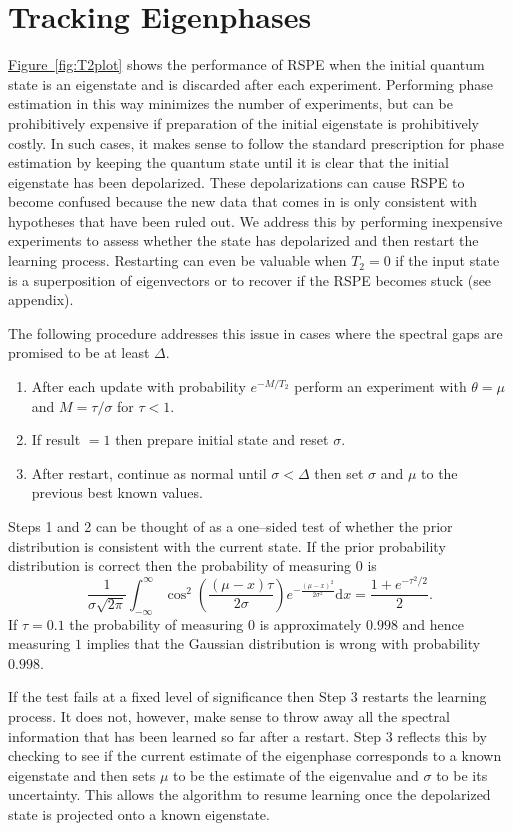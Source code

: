 \documentclass[aps,pra,amsmath,twocolumn,amssymb,superscriptaddress]{revtex4-1}
\newcommand{\fig}[1]{\hyperref[fig:#1]{Figure~\ref*{fig:#1}}}
\begin{document}
\section{Tracking Eigenphases}
\fig{T2plot} shows the performance of RSPE when the initial quantum state is an eigenstate and is discarded after each experiment.  Performing phase estimation in this way minimizes the number of experiments, but can be prohibitively expensive if preparation of the initial eigenstate is prohibitively costly.  In such cases, it makes sense to follow the standard prescription for phase estimation by keeping the quantum state until it is clear that the initial eigenstate has been depolarized.  These depolarizations can cause RSPE to become confused because the new data that comes in is only consistent with hypotheses that have been ruled out.  We address this by performing inexpensive experiments to assess whether the state has depolarized and then restart the learning process. Restarting can even be valuable when $T_2=0$ if the input state is a superposition of eigenvectors or to recover if the RSPE becomes stuck (see appendix).

The following procedure addresses this issue in cases where the spectral gaps are promised to be at least $\Delta$.
\begin{enumerate}
\item After each update with probability $e^{-M/T_2}$ perform an experiment with $\theta=\mu$ and $M=\tau/\sigma$ for $\tau< 1$.
\item If result $=1$ then prepare initial state and reset $\sigma$.
\item After restart, continue as normal until $\sigma<\Delta$ then set $\sigma$ and $\mu$ to the previous best known values.
\end{enumerate}

Steps 1 and 2 can be thought of as a one--sided test of whether the prior distribution is consistent with the current state.
If the prior probability distribution is correct then the probability of measuring $0$ is
\begin{equation}
\frac{1}{\sigma\sqrt{2\pi}}\int_{-\infty}^\infty \cos^2\left(\frac{(\mu-x)\tau}{2\sigma}\right)e^{-\frac{(\mu-x)^2}{2\sigma^2}} \mathrm{d}x = \frac{1+e^{-\tau^2/2}}{2}.
\end{equation}
If $\tau=0.1$ the probability of measuring $0$ is approximately $0.998$ and hence measuring $1$ implies that the Gaussian distribution is wrong with probability $0.998$.

If the test fails at a fixed level of significance then Step 3 restarts the learning process. It does not, however, make sense to throw away all the spectral information that has been learned so far after a restart.  Step 3 reflects this by checking to see if the current estimate of the eigenphase corresponds to a known eigenstate and then sets $\mu$ to be the estimate of the eigenvalue and $\sigma$ to be its uncertainty.  This allows the algorithm to resume learning once the depolarized state is projected onto a known eigenstate.
\end{document}
